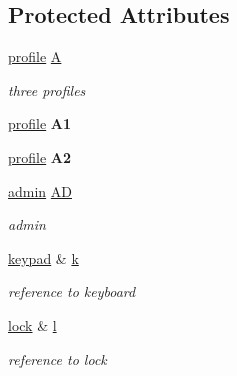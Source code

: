 \subsection*{Protected Attributes}
\begin{DoxyCompactItemize}
\item 
\hyperlink{classprofile}{profile} \hyperlink{classsystem_a3c26dc3758d838e0b8f2233b7d9dfb3e}{A}\hypertarget{classsystem_a3c26dc3758d838e0b8f2233b7d9dfb3e}{}\label{classsystem_a3c26dc3758d838e0b8f2233b7d9dfb3e}

\begin{DoxyCompactList}\small\item\em three profiles \end{DoxyCompactList}\item 
\hyperlink{classprofile}{profile} {\bfseries A1}\hypertarget{classsystem_a18fe7315f4fd2073f4d74dd0110eb8bd}{}\label{classsystem_a18fe7315f4fd2073f4d74dd0110eb8bd}

\item 
\hyperlink{classprofile}{profile} {\bfseries A2}\hypertarget{classsystem_acc111b300ae91767f1badecb7884f376}{}\label{classsystem_acc111b300ae91767f1badecb7884f376}

\item 
\hyperlink{classadmin}{admin} \hyperlink{classsystem_aef5e8502943f8b3bb8c6e6b260b2d25e}{AD}\hypertarget{classsystem_aef5e8502943f8b3bb8c6e6b260b2d25e}{}\label{classsystem_aef5e8502943f8b3bb8c6e6b260b2d25e}

\begin{DoxyCompactList}\small\item\em admin \end{DoxyCompactList}\item 
\hyperlink{classkeypad}{keypad} \& \hyperlink{classsystem_a8f63afc4e8e5cbd5b359b7b67d05ddcf}{k}\hypertarget{classsystem_a8f63afc4e8e5cbd5b359b7b67d05ddcf}{}\label{classsystem_a8f63afc4e8e5cbd5b359b7b67d05ddcf}

\begin{DoxyCompactList}\small\item\em reference to keyboard \end{DoxyCompactList}\item 
\hyperlink{classlock}{lock} \& \hyperlink{classsystem_a04508082c7cd8057141df6756329d8d1}{l}\hypertarget{classsystem_a04508082c7cd8057141df6756329d8d1}{}\label{classsystem_a04508082c7cd8057141df6756329d8d1}

\begin{DoxyCompactList}\small\item\em reference to lock \end{DoxyCompactList}\end{DoxyCompactItemize}


